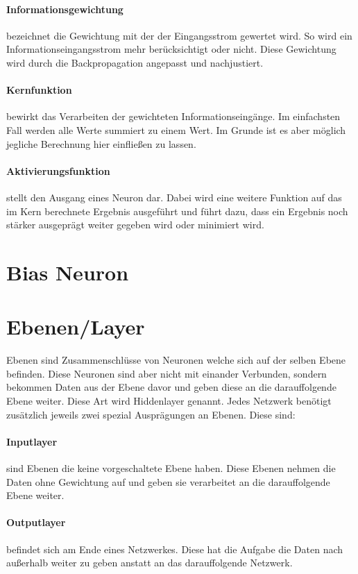 \paragraph{Informationsgewichtung} bezeichnet die Gewichtung mit der der Eingangsstrom gewertet wird. So wird ein Informationseingangsstrom mehr berücksichtigt oder nicht. Diese Gewichtung wird durch die Backpropagation angepasst und nachjustiert.
\paragraph{Kernfunktion} bewirkt das Verarbeiten der gewichteten Informationseingänge. Im einfachsten Fall werden alle Werte summiert zu einem Wert. Im Grunde ist es aber möglich jegliche Berechnung hier einfließen zu lassen.
\paragraph{Aktivierungsfunktion} stellt den Ausgang eines Neuron dar. Dabei wird eine weitere Funktion auf das im Kern berechnete Ergebnis ausgeführt und führt dazu, dass ein Ergebnis noch stärker ausgeprägt weiter gegeben wird oder minimiert wird.

\section{Bias Neuron}

\section{Ebenen/Layer}

Ebenen sind Zusammenschlüsse von Neuronen welche sich auf der selben Ebene befinden. Diese Neuronen sind aber nicht mit einander Verbunden, sondern bekommen Daten aus der Ebene davor und geben diese an die darauffolgende Ebene weiter. Diese Art wird Hiddenlayer genannt. Jedes Netzwerk benötigt zusätzlich jeweils zwei spezial Ausprägungen an Ebenen. Diese sind:

\paragraph{Inputlayer} sind Ebenen die keine vorgeschaltete Ebene haben. Diese Ebenen nehmen die Daten ohne Gewichtung auf und geben sie verarbeitet an die darauffolgende Ebene weiter.

\paragraph{Outputlayer} befindet sich am Ende eines Netzwerkes. Diese hat die Aufgabe die Daten nach außerhalb weiter zu geben anstatt an das darauffolgende Netzwerk.

